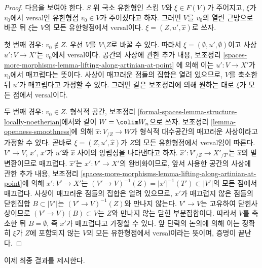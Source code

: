 \begin{proof}
다음을 보여야 한다. $S$ 위 국소 유한형인 스킴 $V$와
$\xi \in F(V)$가 주어지고, $\xi$가 $v_0$에서 versal인 유한형점
$v_0 \in V$가 주어졌다고 하자. 그러면 $V$를 $v_0$의 열린 근방으로
바꾼 뒤 $\xi$는 $V$의 모든 유한형점에서 versal이다.
$\xi = (Z, u', \hat x)$로 쓰자.

\medskip\noindent
첫 번째 경우: $v_0 \not \in Z$. 우선 $V$를 $V \setminus Z$로
바꿀 수 있다. 따라서 $\xi = (\emptyset, u', \emptyset)$이고
사상 $u' : V \to X'$는 $v_0$에서 versal이다.
공간의 사상에 관한 추가 내용, 보조정리
\ref{spaces-more-morphisms-lemma-lifting-along-artinian-at-point}
에 의해 이는 $u' : V \to X'$가 $v_0$에서 매끄럽다는 뜻이다.
사상이 매끄러운 점들의 집합은 열려 있으므로, $V$를 축소한 뒤
$u'$가 매끄럽다고 가정할 수 있다. 그러면 같은 보조정리에 의해
원하는 대로 $\xi$가 모든 점에서 versal이다.

\medskip\noindent
두 번째 경우: $v_0 \in Z$. 형식적 공간, 보조정리
\ref{formal-spaces-lemma-structure-locally-noetherian}에서와 같이
$W = \colim W_n$으로 쓰자.
보조정리 \ref{lemma-openness-smoothness}에 의해
$\hat x : V_{/Z} \to W$가 형식적 대수공간의 매끄러운 사상이라고
가정할 수 있다. 곧바로 $\xi = (Z, u', \hat x)$가 $Z$의 모든
유한형점에서 versal임이 따른다. $V' \to V$, $\hat x'$, $x'$가
$u'$와 $\hat x$ 사이의 양립성을 나타낸다고 하자.
$\hat x' : V'_{/Z} \to X'_{/T'}$는 $\hat x$의 밑변환이므로 매끄럽다.
$\hat x'$는 $x' : V' \to X'$의 완비화이므로, 앞서 사용한
공간의 사상에 관한 추가 내용, 보조정리
\ref{spaces-more-morphisms-lemma-lifting-along-artinian-at-point}에 의해
$x' : V' \to X'$는
$(V' \to V)^{-1}(Z) = |x'|^{-1}(T') \subset |V'|$의 모든 점에서
매끄럽다. 사상이 매끄러운 점들의 집합은 열려 있으므로,
$x'$가 매끄럽지 않은 점들의 닫힌집합 $B \subset |V'|$는
$(V' \to V)^{-1}(Z)$와 만나지 않는다.
$V' \to V$는 고유하여 닫힌사상이므로
$(V' \to V)(B) \subset V$는 $Z$와 만나지 않는 닫힌 부분집합이다.
따라서 $V$를 축소한 뒤 $B = \emptyset$, 즉 $x'$가 매끄럽다고
가정할 수 있다. 앞 단락의 논의에 의해 이는 정확히 $\xi$가
$Z$에 포함되지 않는 $V$의 모든 유한형점에서 versal이라는 뜻이며,
증명이 끝난다.
\end{proof}

\noindent
이제 최종 결과를 제시한다.

